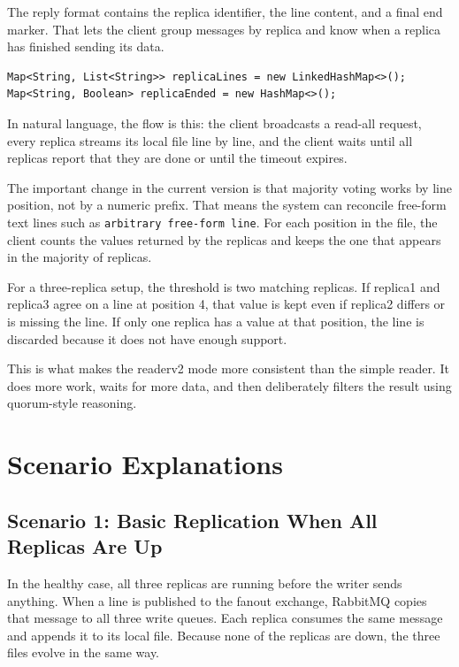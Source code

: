 \documentclass[11pt]{article}
\begin{document}
The reply format contains the replica identifier, the line content, and a final end marker. That lets the client group messages by replica and know when a replica has finished sending its data.

\begin{lstlisting}
Map<String, List<String>> replicaLines = new LinkedHashMap<>();
Map<String, Boolean> replicaEnded = new HashMap<>();
\end{lstlisting}

In natural language, the flow is this: the client broadcasts a read-all request, every replica streams its local file line by line, and the client waits until all replicas report that they are done or until the timeout expires.

The important change in the current version is that majority voting works by line position, not by a numeric prefix. That means the system can reconcile free-form text lines such as \texttt{arbitrary free-form line}. For each position in the file, the client counts the values returned by the replicas and keeps the one that appears in the majority of replicas.

For a three-replica setup, the threshold is two matching replicas. If replica1 and replica3 agree on a line at position 4, that value is kept even if replica2 differs or is missing the line. If only one replica has a value at that position, the line is discarded because it does not have enough support.

This is what makes the readerv2 mode more consistent than the simple reader. It does more work, waits for more data, and then deliberately filters the result using quorum-style reasoning.

\section{Scenario Explanations}

\subsection{Scenario 1: Basic Replication When All Replicas Are Up}

In the healthy case, all three replicas are running before the writer sends anything. When a line is published to the fanout exchange, RabbitMQ copies that message to all three write queues. Each replica consumes the same message and appends it to its local file. Because none of the replicas are down, the three files evolve in the same way.
\end{document}
